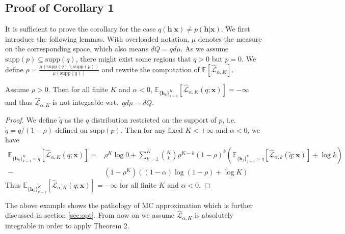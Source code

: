 
\subsection{Proof of Corollary 1}
It is sufficient to prove the corollary for the case $q(\bm{h}|\bm{x}) \neq p(\bm{h}|\bm{x})$. We first introduce the following lemmas. With overloaded notation, $\mu$ denotes the measure on the corresponding space, which also means $dQ = qd\mu$. As we assume $\text{supp}(p) \subseteq \text{supp}(q)$, there might exist some regions that $q > 0$ but $p = 0$. We define $\rho = \frac{\mu(\text{supp}(q) \backslash \text{supp}(p))}{\mu(\text{supp}(q))}$ and rewrite the computation of $\mathbb{E}[\hat{\mathcal{L}}_{\alpha, K}]$.

\begin{lemma}
Assume $\rho > 0$. Then for all finite $K$ and $\alpha < 0$, $\mathbb{E}_{\{\bm{h}_k\}_{k=1}^K} [ \hat{\mathcal{L}}_{\alpha, K}(q; \bm{x}) ] = -\infty$ and thus $\hat{\mathcal{L}}_{\alpha, K}$ is not integrable wrt.~$qd\mu = dQ$.
\label{lemma:alpha_k_non_exist}
\end{lemma}

\begin{proof}
We define $\tilde{q}$ as the $q$ distribution restricted on the support of $p$, i.e.~$\tilde{q} = q / (1 - \rho)$ defined on $\text{supp}(p)$. Then for any fixed $K < +\infty$ and $\alpha < 0$, we have
\begin{equation*}
\begin{aligned}
\mathbb{E}_{\{\bm{h}_k\}_{k=1}^K \sim q} [ \hat{\mathcal{L}}_{\alpha, K}(q; \bm{x}) ] 
=& \rho^{K} \log 0 
+ \sum_{k=1}^K {K \choose k} \rho^{K - k} (1 - \rho)^{k} \left( \mathbb{E}_{\{\bm{h}_j\}_{j=1}^k \sim \tilde{q}}[\hat{\mathcal{L}}_{\alpha, k}(\tilde{q}; \bm{x})] + \log k \right) \\
-& (1 - \rho^K) ((1 - \alpha) \log (1 - \rho) + \log K) 
\end{aligned}
\end{equation*}
Thus $\mathbb{E}_{\{\bm{h}_k\}_{k=1}^K} [ \hat{\mathcal{L}}_{\alpha, K}(q; \bm{x}) ] = -\infty$ for all finite $K$ and $\alpha < 0$. 
\end{proof}

The above example shows the pathology of MC approximation which is further discussed in section \ref{sec:opt}. From now on we assume $\hat{\mathcal{L}}_{\alpha, K}$ is absolutely integrable in order to apply Theorem 2.
 
